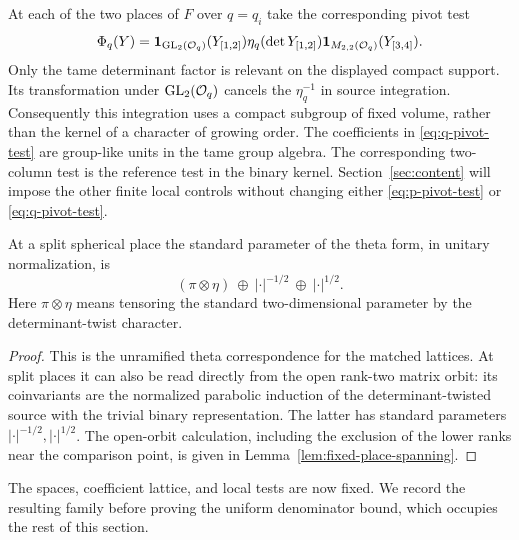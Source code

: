 At each of the two places of $F$ over $q=q_i$ take the corresponding
pivot test
\begin{equation}\label{eq:q-pivot-test}
 \Phi_q(Y)=
 \mathbf 1_{\operatorname{GL}_2(\mathcal O_q)}(Y_{[1,2]})
 \eta_q(\det Y_{[1,2]})
 \mathbf 1_{M_{2,2}(\mathcal O_q)}(Y_{[3,4]}).
\end{equation}
Only the tame determinant factor is relevant on the displayed compact
support.  Its transformation under $\operatorname{GL}_2(\mathcal O_q)$ cancels the
$\eta_q^{-1}$ in source integration.  Consequently this integration uses
a compact subgroup of fixed volume, rather than the kernel of a
character of growing order.  The coefficients in
\eqref{eq:q-pivot-test} are group-like units in the tame group algebra.
The corresponding two-column test is the reference test in the binary
kernel.  Section~\ref{sec:content} will impose the other finite local
controls without changing either \eqref{eq:p-pivot-test} or
\eqref{eq:q-pivot-test}.

\begin{lemma}\label{lem:theta-eigenparameters}
 At a split spherical place the standard parameter of the theta form,
 in unitary normalization, is
 \begin{equation}\label{eq:theta-eigenparameters}
 (\pi\otimes\eta)\ \oplus\ |\cdot|^{-1/2}
                       \ \oplus\ |\cdot|^{1/2}.
 \end{equation}
 Here $\pi\otimes\eta$ means tensoring the standard two-dimensional
 parameter by the determinant-twist character.
\end{lemma}
\begin{proof}
 This is the unramified theta correspondence for the matched lattices.
 At split places it can also be read directly from the open rank-two
 matrix orbit: its coinvariants are the normalized parabolic induction
 of the determinant-twisted source with the trivial binary
 representation.  The latter has standard parameters
 $|\cdot|^{-1/2},|\cdot|^{1/2}$.  The open-orbit calculation, including
 the exclusion of the lower ranks near the comparison point, is given
 in Lemma~\ref{lem:fixed-place-spanning}.
\end{proof}

The spaces, coefficient lattice, and local tests are now fixed.  We
record the resulting family before proving the uniform denominator
bound, which occupies the rest of this section.


